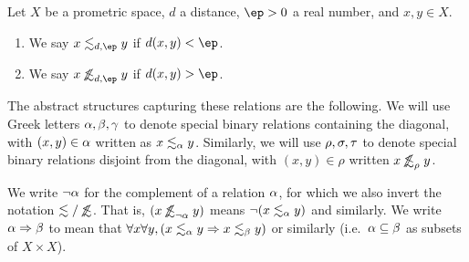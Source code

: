 \documentclass{article}
\def\oapt{\mathrel{\!\not\,\not\lesssim}}
\def\leapx{\lesssim}
\def\ent#1{\leapx_{#1}}
\def\aent#1{\oapt_{#1}}
\let\implies\Rightarrow
\begin{document}
\begin{defn}\label{def:pmet-unif}
  Let $X$ be a prometric space, $d$ a distance, $\ep>0$ a real number, and $x,y\in X$.
  \begin{enumerate}
  \item We say $x \ent{d,\ep} y$ if $d(x,y)<\ep$.
  \item We say $x \aent{d,\ep} y$ if $d(x,y)>\ep$.
  \end{enumerate}
\end{defn}

The abstract structures capturing these relations are the following.
We will use Greek letters $\alpha,\beta,\gamma$ to denote special binary relations containing the diagonal, with $(x,y)\in \alpha$ written as $x\ent\al y$.
Similarly, we will use $\rho,\sigma,\tau$ to denote special binary relations disjoint from the diagonal, with $
(x,y)\in\rho$ written $x \aent\rho y$.

We write $\neg\alpha$ for the complement of a relation $\alpha$, for which we also invert the notation $\leapx/\oapt$.
That is, $(x \aent{\neg\al} y)$ means $\neg (x\ent{\al} y)$ and similarly.
We write $\al\implies\be$ to mean that $\forall x\forall y,(x\ent\al y \implies x\ent\be y)$ or similarly (i.e.\ $\alpha\subseteq \beta$ as subsets of $X\times X$).
\end{document}
